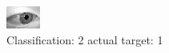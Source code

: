 \begin{figure}[h!]
\begin{center}
\includegraphics[width=0.60\columnwidth]{figures/ID2740_class_2_target_1.png}
\end{center}
\caption{ Classification: 2 actual target: 1}
\label{fig:ID2740_class_2_target_1}
\end{figure}
